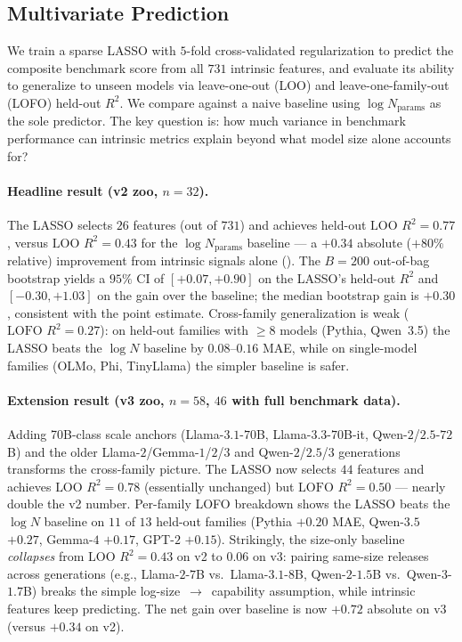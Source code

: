\documentclass[preprint]{neurips_2025}
\begin{document}
\subsection{Multivariate Prediction}
\label{sec:multivariate}

We train a sparse LASSO with $5$-fold cross-validated regularization to predict the composite benchmark score from all $731$ intrinsic features, and evaluate its ability to generalize to unseen models via leave-one-out (LOO) and leave-one-family-out (LOFO) held-out $R^2$.
We compare against a naive baseline using $\log N_{\text{params}}$ as the sole predictor.
The key question is: how much variance in benchmark performance can intrinsic metrics explain beyond what model size alone accounts for?

\paragraph{Headline result (v2 zoo, $n = 32$).}
The LASSO selects $26$ features (out of $731$) and achieves held-out $\text{LOO } R^2 = 0.77$, versus $\text{LOO } R^2 = 0.43$ for the $\log N_{\text{params}}$ baseline --- a $+0.34$ absolute ($+80\%$ relative) improvement from intrinsic signals alone (). The $B = 200$ out-of-bag bootstrap yields a $95\%$ CI of $[+0.07, +0.90]$ on the LASSO's held-out $R^2$ and $[-0.30, +1.03]$ on the gain over the baseline; the median bootstrap gain is $+0.30$, consistent with the point estimate. Cross-family generalization is weak ($\text{LOFO } R^2 = 0.27$): on held-out families with $\geq 8$ models (Pythia, Qwen~3.5) the LASSO beats the $\log N$ baseline by $0.08$--$0.16$ MAE, while on single-model families (OLMo, Phi, TinyLlama) the simpler baseline is safer.

\paragraph{Extension result (v3 zoo, $n = 58$, $46$ with full benchmark data).}
Adding 70B-class scale anchors (Llama-$3.1$-$70$B, Llama-$3.3$-$70$B-it, Qwen-$2$/$2.5$-$72$B) and the older Llama-$2$/Gemma-$1$/$2$/$3$ and Qwen-$2$/$2.5$/$3$ generations transforms the cross-family picture. The LASSO now selects $44$ features and achieves $\text{LOO } R^2 = 0.78$ (essentially unchanged) but $\text{LOFO } R^2 = 0.50$ --- nearly double the v2 number. Per-family LOFO breakdown shows the LASSO beats the $\log N$ baseline on $11$ of $13$ held-out families (Pythia $+0.20$ MAE, Qwen-$3.5$ $+0.27$, Gemma-$4$ $+0.17$, GPT-$2$ $+0.15$). Strikingly, the size-only baseline \emph{collapses} from $\text{LOO } R^2 = 0.43$ on v2 to $0.06$ on v3: pairing same-size releases across generations (e.g., Llama-$2$-$7$B vs.\ Llama-$3.1$-$8$B, Qwen-$2$-$1.5$B vs.\ Qwen-$3$-$1.7$B) breaks the simple log-size~$\to$~capability assumption, while intrinsic features keep predicting. The net gain over baseline is now $+0.72$ absolute on v3 (versus $+0.34$ on v2).
\end{document}
